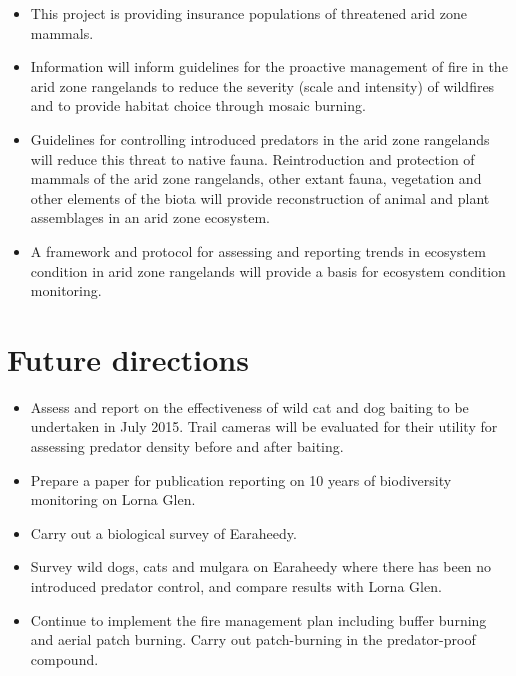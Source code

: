 \documentclass[version=last,
    paper=a4, %
    10pt, %
    usenames,
    dvipsnames,
    oneside, %
    headings=openany, %
    DIV=15 %
]{scrbook}
\begin{document}
\begin{itemize}
\itemsep1pt\parskip0pt
\item
  This project is providing insurance populations of threatened arid
  zone mammals.
\item
  Information will inform guidelines for the proactive management of
  fire in the arid zone rangelands to reduce the severity (scale and
  intensity) of wildfires and to provide habitat choice through mosaic
  burning.
\item
  Guidelines for controlling introduced predators in the arid zone
  rangelands will reduce this threat to native fauna. Reintroduction and
  protection of mammals of the arid zone rangelands, other extant fauna,
  vegetation and other elements of the biota will provide reconstruction
  of animal and plant assemblages in an arid zone ecosystem.
\item
  A framework and protocol for assessing and reporting trends in
  ecosystem condition in arid zone rangelands will provide a basis for
  ecosystem condition monitoring.
\end{itemize}




\section*{Future directions}

\begin{itemize}
\itemsep1pt\parskip0pt
\item
  Assess and report on the effectiveness of wild cat and dog baiting to
  be undertaken in July 2015. Trail cameras will be evaluated for their
  utility for assessing predator density before and after baiting.
\item
  Prepare a paper for publication reporting on 10 years of biodiversity
  monitoring on Lorna Glen.
\item
  Carry out a biological survey of Earaheedy.
\item
  Survey wild dogs, cats and mulgara on Earaheedy where there has been
  no introduced predator control, and compare results with Lorna Glen.
\item
  Continue to implement the fire management plan including buffer
  burning and aerial patch burning. Carry out patch-burning in the
  predator-proof compound.
\end{itemize}



\end{document}
